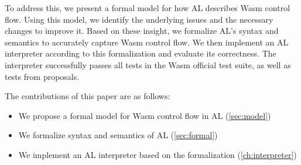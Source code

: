 To address this, we present a formal model for how AL describes Wasm control
flow.
Using this model, we identify the underlying issues and the necessary changes
to improve it.
Based on these insight, we formalize AL's syntax and semantics to accurately
capture Wasm control flow.
We then implement an AL interpreter according to this formalization and
evaluate its correctness.
The interpreter successfully passes all tests in the Wasm official test suite,
as well as tests from proposals.


The contributions of this paper are as follows:
\begin{itemize}
  \item We propose a formal model for Wasm control flow in AL
    (\cref{sec:model})
  \item We formalize syntax and semantics of AL (\cref{sec:formal})
  \item We implement an AL interpreter based on the formalization
    (\cref{ch:interpreter})
\end{itemize}
